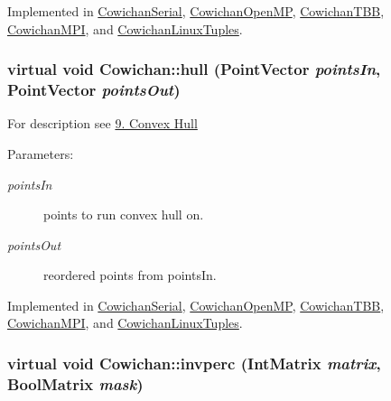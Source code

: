 Implemented in \hyperlink{class_cowichan_serial_c08a6b3e23ce26959bac12af077f924f}{CowichanSerial}, \hyperlink{class_cowichan_open_m_p_70989ffe182aebf590e39c56e146b0fb}{CowichanOpenMP}, \hyperlink{class_cowichan_t_b_b_bbf17e641657d54fc0c571c008ac8f7a}{CowichanTBB}, \hyperlink{class_cowichan_m_p_i_154bbd1a400ee4571f761bff1cdf67cd}{CowichanMPI}, and \hyperlink{class_cowichan_linux_tuples_f3bd58ad2653f06d242d473e7bffda0b}{CowichanLinuxTuples}.\hypertarget{class_cowichan_0c6b68ae3c059b66893405f8530a2e0a}{
\subsubsection[{hull}]{\setlength{\rightskip}{0pt plus 5cm}virtual void Cowichan::hull ({\bf PointVector} {\em pointsIn}, \/  {\bf PointVector} {\em pointsOut})}}
\label{class_cowichan_0c6b68ae3c059b66893405f8530a2e0a}


For description see \hyperlink{index_hull_sec}{9. Convex Hull} \begin{Desc}
\item[Parameters:]
\begin{description}
\item[{\em pointsIn}]points to run convex hull on. \item[{\em pointsOut}]reordered points from pointsIn. \end{description}
\end{Desc}


Implemented in \hyperlink{class_cowichan_serial_e75cedf0a296dd7ad3dc41cadc51776f}{CowichanSerial}, \hyperlink{class_cowichan_open_m_p_cb444dd3e2c0f1f27f4135de0279d09e}{CowichanOpenMP}, \hyperlink{class_cowichan_t_b_b_0d23aa05dc21fd9e8b033769097b4b18}{CowichanTBB}, \hyperlink{class_cowichan_m_p_i_22b3dce35fd93635bd4c1596e7fb839c}{CowichanMPI}, and \hyperlink{class_cowichan_linux_tuples_501f87594d62af261ff0b1954a60ddc4}{CowichanLinuxTuples}.\hypertarget{class_cowichan_ea126792a31e54a8722663b7ea768955}{
\subsubsection[{invperc}]{\setlength{\rightskip}{0pt plus 5cm}virtual void Cowichan::invperc ({\bf IntMatrix} {\em matrix}, \/  {\bf BoolMatrix} {\em mask})}}
\label{class_cowichan_ea126792a31e54a8722663b7ea768955}


